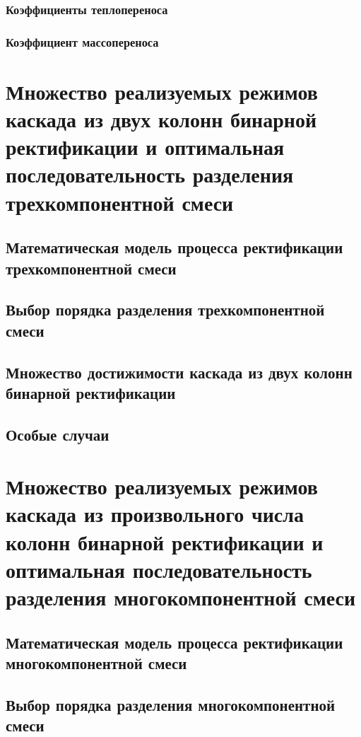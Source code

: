\documentclass{article}
\begin{document}
		\subsubsection{Коэффициенты теплопереноса}
		
		\subsubsection{Коэффициент массопереноса}

\section{Множество реализуемых режимов каскада из двух колонн бинарной ректификации и оптимальная последовательность разделения трехкомпонентной смеси}

	\subsection{Математическая модель процесса ректификации трехкомпонентной смеси}
	
	\subsection{Выбор порядка разделения трехкомпонентной смеси}
	
	\subsection{Множество достижимости каскада из двух колонн бинарной ректификации}
		\subsection{Особые случаи}
	

\section{Множество реализуемых режимов каскада из произвольного числа колонн бинарной ректификации и оптимальная последовательность разделения многокомпонентной смеси}

	\subsection{Математическая модель процесса ректификации многокомпонентной смеси}
	
	\subsection{Выбор порядка разделения многокомпонентной смеси}
	
\end{document}
